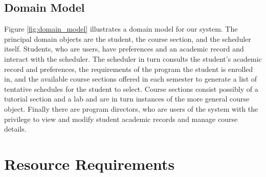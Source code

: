 \documentclass[12pt]{article}
\begin{document}
\subsection{Domain Model}
Figure \ref{fig:domain_model} illustrates a domain model for our system. The principal domain objects are the student, the course section, and the scheduler itself. Students, who are users, have preferences and an academic record and interact with the scheduler. The scheduler in turn consults the student's academic record and preferences, the requirements of the program the student is enrolled in, and the available course sections offered in each semester to generate a list of tentative schedules for the student to select. Course sections consist possibly of a tutorial section and a lab and are in turn instances of the more general course object. Finally there are program directors, who are users of the system with the privilege to view and modify student academic records and manage course details.


\vfill
\newpage
\section{Resource Requirements}
\end{document}
